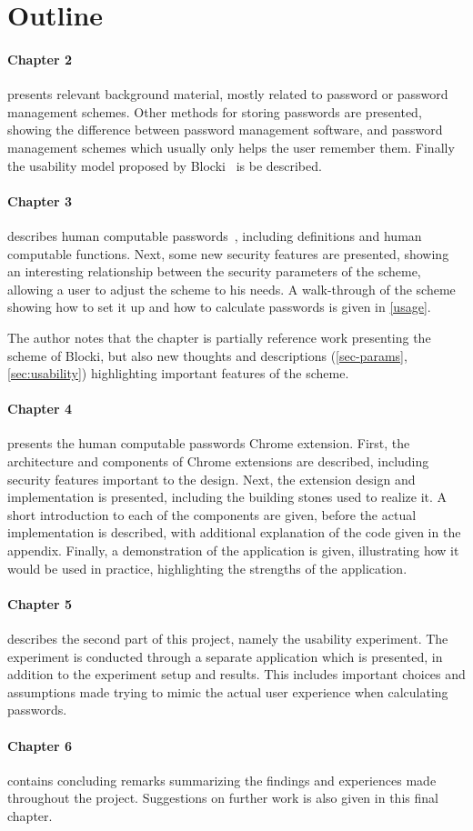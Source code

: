 \section{Outline}
\paragraph{Chapter 2} presents relevant background material, mostly related to password or password management schemes. Other methods for storing passwords are presented, showing the difference between password management software, and password management schemes which usually only helps the user remember them. Finally the usability model proposed by Blocki~\cite{Blocki2014} is be described.
\paragraph{Chapter 3} describes human computable passwords~\cite{hcp-blocki}, including definitions and human computable functions. Next, some new security features are presented, showing an interesting relationship between the security parameters of the scheme, allowing a user to adjust the scheme to his needs. A walk-through of the scheme showing how to set it up and how to calculate passwords is given in \autoref{usage}.
\par The author notes that the chapter is partially reference work presenting the scheme of Blocki, but also new thoughts and descriptions (\autoref{sec-params}, \autoref{sec:usability}) highlighting important features of the scheme. 
\paragraph{Chapter 4} presents the human computable passwords Chrome extension. First, the architecture and components of Chrome extensions are described, including security features important to the design. Next, the extension design and implementation is presented, including the building stones used to realize it. A short introduction to each of the components are given, before the actual implementation is described, with additional explanation of the code given in the appendix. Finally, a demonstration of the application is given, illustrating how it would be used in practice, highlighting the strengths of the application.
\paragraph{Chapter 5} describes the second part of this project, namely the usability experiment. The experiment is conducted through a separate application which is presented, in addition to the experiment setup and results. This includes important choices and assumptions made trying to mimic the actual user experience when calculating passwords.
\paragraph{Chapter 6} contains concluding remarks summarizing the findings and experiences made throughout the project. Suggestions on further work is also given in this final chapter.


